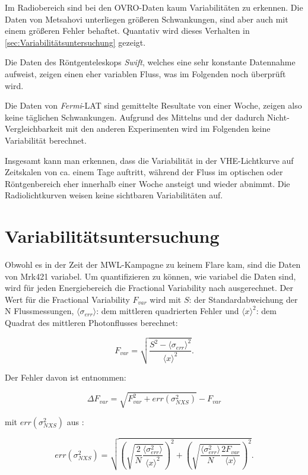 Im Radiobereich sind bei den OVRO-Daten kaum Variabilitäten zu erkennen. 
Die Daten von Metsahovi unterliegen größeren Schwankungen, sind aber auch mit einem größeren Fehler behaftet.
Quantativ wird dieses Verhalten in \autoref{sec:Variabilitätsuntersuchung} gezeigt.

Die Daten des Röntgenteleskops \textit{Swift}, welches eine sehr konstante Datennahme aufweist, zeigen einen eher variablen Fluss, was im Folgenden noch überprüft wird.

Die Daten von \textit{Fermi}-LAT sind gemittelte Resultate von einer Woche, zeigen also keine täglichen Schwankungen.
Aufgrund des Mittelns und der dadurch Nicht-Vergleichbarkeit mit den anderen Experimenten wird im Folgenden keine Variabilität berechnet.

Insgesamt kann man erkennen, dass die Variabilität in der VHE-Lichtkurve auf Zeitskalen von ca. einem Tage auftritt, während der Fluss im optischen oder Röntgenbereich eher innerhalb einer Woche ansteigt und wieder abnimmt. 
Die Radiolichtkurven weisen keine sichtbaren Variabilitäten auf.

\section{Variabilitätsuntersuchung}
\label{sec:Variabilitätsuntersuchung}
Obwohl es in der Zeit der MWL-Kampagne zu keinem Flare kam, sind die Daten von Mrk421 variabel.
Um quantifizieren zu können, wie variabel die Daten sind, wird für jeden Energiebereich die Fractional Variability nach \cite{Vaughan} ausgerechnet.
Der Wert für die Fractional Variability $F_{var}$ wird mit $S$: der Standardabweichung der N Flussmessungen, $\langle \sigma_{err} \rangle$: dem mittleren quadrierten Fehler und $\langle x \rangle^2$: dem Quadrat des mittleren Photonflusses berechnet:

\begin{equation}
 F_{var}=\sqrt{\frac{S^2-\langle \sigma_{err} \rangle^2}{\langle x \rangle^2}}.
\end{equation}

Der Fehler davon ist \cite{FehlerVariability} entnommen: 

\begin{equation}
 \Delta F_{var}=\sqrt{F_{var}^2+err(\sigma_{NXS}^2)}-F_{var}
\end{equation}

mit $err(\sigma_{NXS}^2)$ aus \cite{Vaughan}:

\begin{equation}
 err(\sigma_{NXS}^2)=\sqrt{\left(\sqrt{\frac{2}{N} \frac{\langle \sigma_{err}^2 \rangle}{\langle x \rangle^2}} \right)^2 + \left( \sqrt{\frac{\langle\sigma_{err}^2 \rangle}{N} \frac{2F_{var}}{\langle x \rangle}} \right)^2}.
\end{equation}

